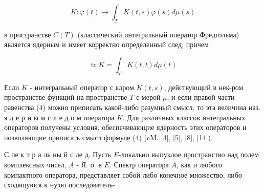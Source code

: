\documentclass[10pt]{article}
\begin{document}
\[

K: \varphi(t) \mapsto \int_{T} K(t, s) \varphi(s) d \mu(s)

\]



в пространстве $C(T)$ (классический интегральный оператор Фредгольма) является ядерным и имеет корректно определенный след, причем



\[

\operatorname{tr} K=\int_{T} K(t, t) d \mu(t)

\]



Если $K$ - интегральный оператор с ядром $K(t, s)$, действующий в нек-ром пространстве функций на пространстве $T$ с мерой $\mu$, и если правой части равенства (4) можно приписать какой-либо разумный смысл, то эта величина наз. я д е р н ы м с л е д о м оператора $K$. Для различных классов интегральных операторов получены условия, обеспечивающие ядерность этих операторов и позволяющие приписать смысл формуле (4) (cM. [4], [5], [8], [14]).



С пе к т р а ль ны й с ле д. Пусть $E$-локально выпуклое пространство над полем комплексных чисел, $A$ - Я. о. в $E$. Спектр оператора $A$, как и любого компактного оператора, представляет собой либо конечное множество, либо сходящуюся к нулю последователь-
\end{document}
